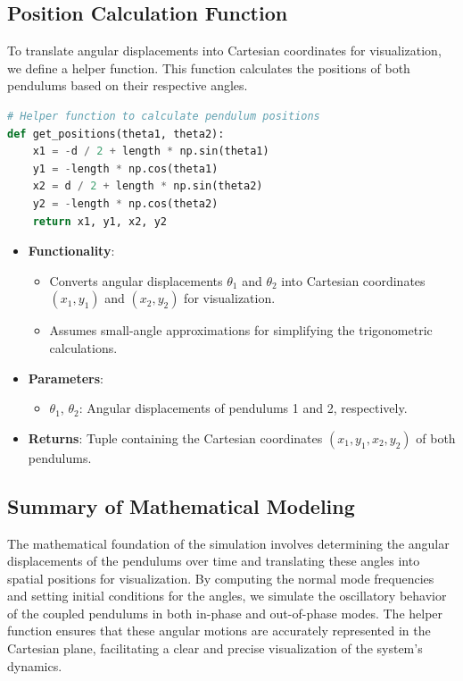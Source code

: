 \documentclass[12pt]{report} %
\begin{document}
\subsection{Position Calculation Function}
\label{subsec:part1_task3_position_function}

To translate angular displacements into Cartesian coordinates for visualization, we define a helper function. This function calculates the positions of both pendulums based on their respective angles.

\begin{lstlisting}[language=Python, caption={Function to Calculate Pendulum Positions}, label={lst:position_calculation}]
# Helper function to calculate pendulum positions
def get_positions(theta1, theta2):
    x1 = -d / 2 + length * np.sin(theta1)
    y1 = -length * np.cos(theta1)
    x2 = d / 2 + length * np.sin(theta2)
    y2 = -length * np.cos(theta2)
    return x1, y1, x2, y2
\end{lstlisting}

\begin{itemize}
    \item \textbf{Functionality}:
    \begin{itemize}
        \item Converts angular displacements \( \theta_1 \) and \( \theta_2 \) into Cartesian coordinates \( (x_1, y_1) \) and \( (x_2, y_2) \) for visualization.
        \item Assumes small-angle approximations for simplifying the trigonometric calculations.
    \end{itemize}
    
    \item \textbf{Parameters}:
    \begin{itemize}
        \item \( \theta_1 \), \( \theta_2 \): Angular displacements of pendulums 1 and 2, respectively.
    \end{itemize}
    
    \item \textbf{Returns}: Tuple containing the Cartesian coordinates \( (x_1, y_1, x_2, y_2) \) of both pendulums.
\end{itemize}

\subsection{Summary of Mathematical Modeling}
\label{subsec:part1_task3_summary}

The mathematical foundation of the simulation involves determining the angular displacements of the pendulums over time and translating these angles into spatial positions for visualization. By computing the normal mode frequencies and setting initial conditions for the angles, we simulate the oscillatory behavior of the coupled pendulums in both in-phase and out-of-phase modes. The helper function ensures that these angular motions are accurately represented in the Cartesian plane, facilitating a clear and precise visualization of the system's dynamics.
\end{document}
